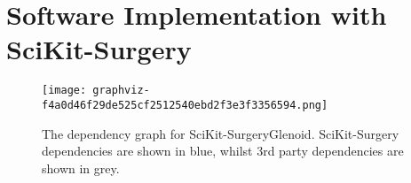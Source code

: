 \section{Software Implementation with SciKit-Surgery}
\immediate{}


\begin{figure}
	\begin{center}
		\texttt{[image: graphviz-f4a0d46f29de525cf2512540ebd2f3e3f3356594.png]}
                        \caption{The dependency graph for SciKit-SurgeryGlenoid. SciKit-Surgery dependencies are shown in blue, whilst 3rd party dependencies are shown in grey.}
	\end{center}
\end{figure}
